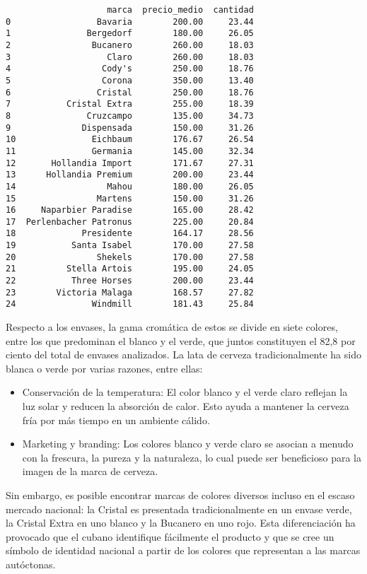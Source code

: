 \begin{verbatim}
                    marca  precio_medio  cantidad
0                 Bavaria        200.00     23.44
1               Bergedorf        180.00     26.05
2                Bucanero        260.00     18.03
3                   Claro        260.00     18.03
4                  Cody's        250.00     18.76
5                  Corona        350.00     13.40
6                 Cristal        250.00     18.76
7           Cristal Extra        255.00     18.39
8               Cruzcampo        135.00     34.73
9              Dispensada        150.00     31.26
10               Eichbaum        176.67     26.54
11               Germania        145.00     32.34
12       Hollandia Import        171.67     27.31
13      Hollandia Premium        200.00     23.44
14                  Mahou        180.00     26.05
15                Martens        150.00     31.26
16     Naparbier Paradise        165.00     28.42
17  Perlenbacher Patronus        225.00     20.84
18             Presidente        164.17     28.56
19           Santa Isabel        170.00     27.58
20                Shekels        170.00     27.58
21          Stella Artois        195.00     24.05
22           Three Horses        200.00     23.44
23        Victoria Malaga        168.57     27.82
24               Windmill        181.43     25.84
\end{verbatim}

Respecto a los envases, la gama cromática de estos se divide en siete
colores, entre los que predominan el blanco y el verde, que juntos
constituyen el 82,8 por ciento del total de envases analizados. La lata
de cerveza tradicionalmente ha sido blanca o verde por varias razones,
entre ellas:

\begin{itemize}
\tightlist
\item
  Conservación de la temperatura: El color blanco y el verde claro
  reflejan la luz solar y reducen la absorción de calor. Esto ayuda a
  mantener la cerveza fría por más tiempo en un ambiente cálido.
\item
  Marketing y branding: Los colores blanco y verde claro se asocian a
  menudo con la frescura, la pureza y la naturaleza, lo cual puede ser
  beneficioso para la imagen de la marca de cerveza.
\end{itemize}

Sin embargo, es posible encontrar marcas de colores diversos incluso en
el escaso mercado nacional: la Cristal es presentada tradicionalmente en
un envase verde, la Cristal Extra en uno blanco y la Bucanero en uno
rojo. Esta diferenciación ha provocado que el cubano identifique
fácilmente el producto y que se cree un símbolo de identidad nacional a
partir de los colores que representan a las marcas autóctonas.

